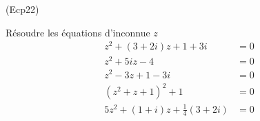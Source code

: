 \begin{tiny}(Ecp22)\end{tiny}
Résoudre les équations d'inconnue $z$
\begin{align}
 z^2+(3+2i)z+1+3i&=0 \\
 z^2 + 5iz-4 &=0\\
 z^2-3z+1-3i &= 0\\
 (z^2+z+1)^2+1 &= 0\\
 5z^2 + (1+i)z + \frac{1}{4}(3+2i) &= 0
\end{align}
